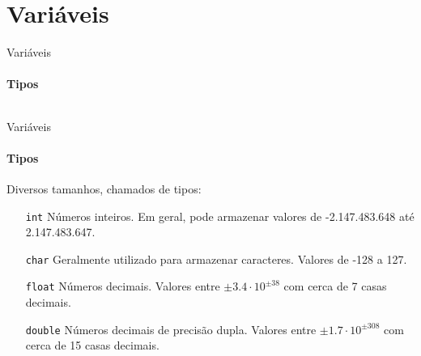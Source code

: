 \documentclass{beamer}
\begin{document}
\section{Variáveis}
\begin{frame}[fragile]{Variáveis}
	\framesubtitle{Tipos}
	\inputminted{c}{resources/variable.c}
	\begin{figure}
	\end{figure}
\end{frame}
\begin{frame}{Variáveis}
	\framesubtitle{Tipos}
	Diversos tamanhos, chamados de \alert{tipos}:
	\begin{itemize}
		\item [\texttt{int}] Números inteiros. Em geral, pode armazenar valores de -2.147.483.648 até 2.147.483.647.
		\item [\texttt{char}] Geralmente utilizado para armazenar caracteres. Valores de -128 a 127.
		\item [\texttt{float}] Números decimais. Valores entre $\pm 3.4 \cdot 10^{\pm38}$ com cerca de 7 casas decimais.
		\item [\texttt{double}] Números decimais de precisão dupla. Valores entre $\pm 1.7 \cdot 10^{\pm308}$ com cerca de 15 casas decimais.
	\end{itemize}
\end{frame}
\end{document}
